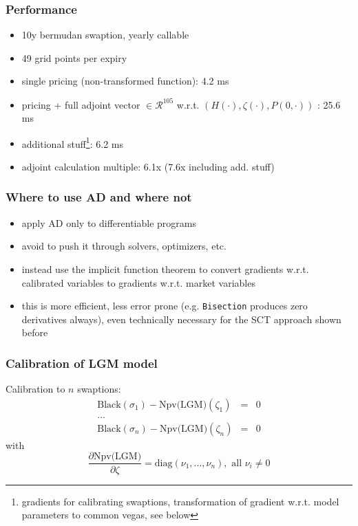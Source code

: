 \documentclass{beamer}
\begin{document}
\begin{frame}[fragile]
\frametitle{Performance}
\begin{itemize}
\item 10y bermudan swaption, yearly callable
\item 49 grid points per expiry
\item single pricing (non-transformed function): 4.2 ms
\item pricing + full adjoint vector $\in \mathcal{R}^{105}$ w.r.t. $(H(\cdot),\zeta(\cdot),P(0,\cdot))$ : 25.6 ms
\item additional stuff\footnote{gradients for calibrating swaptions, transformation of gradient w.r.t. model parameters to common vegas, see below}: 6.2 ms
\item adjoint calculation multiple: 6.1x (7.6x including add. stuff)
\end{itemize}
\end{frame}

\begin{frame}[fragile]
\frametitle{Where to use AD and where not}
\begin{itemize}
\item apply AD only to differentiable programs
\item avoid to push it through solvers, optimizers, etc.
\item instead use the implicit function theorem to convert gradients w.r.t. calibrated variables to gradients w.r.t. market variables
\item this is more efficient, less error prone (e.g. \verb+Bisection+ produces zero derivatives always), even technically necessary for the SCT approach shown before
\end{itemize}
\end{frame}

\begin{frame}[fragile]
\frametitle{Calibration of LGM model}
Calibration to $n$ swaptions:
\begin{eqnarray*}
\text{Black}(\sigma_1) - \text{Npv(LGM)}(\zeta_1) &=& 0 \\
... \\
\text{Black}(\sigma_n) - \text{Npv(LGM)}(\zeta_n) &=& 0
\end{eqnarray*}
with
\begin{equation}
\frac{\partial \text{Npv(LGM)}}{\partial \zeta} = \text{diag}(\nu_1, ..., \nu_n), \text{ all } \nu_i \neq 0
\end{equation}
\end{frame}
\end{document}
